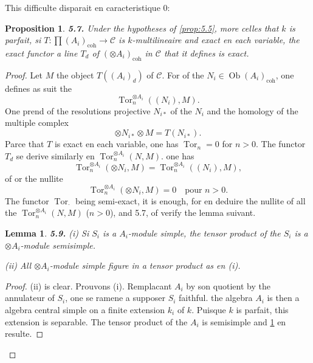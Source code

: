 \documentclass[12pt,a4paper]{article}
\theoremstyle{plain}
\newtheorem{lemma}[theorem]{Lemma}
\newtheorem{proposition}[theorem]{Proposition}
\theoremstyle{definition}
\theoremstyle{remark}
\DeclareMathOperator{\Tor}{Tor}
\DeclareMathOperator{\Ob}{Ob}
\begin{document}
This difficulte disparait en caracteristique 0:

\begin{proposition}\label{prop:5.7}
\textbf{5.7.} Under the hypotheses of \ref{prop:5.5}, more celles that $k$ is parfait, si $T : \prod (A_i)_\mathrm{coh} \to \mathcal{C}$ is $k$-multilineaire and exact en each variable, the exact functor a line $T_d$ of $(\otimes A_i)_\mathrm{coh}$ in $\mathcal{C}$ that it defines is exact.
\end{proposition}

\begin{proof}
Let $M$ the object $T((A_i)_d)$ of $\mathcal{C}$. For of the $N_i \in \Ob(A_i)_\mathrm{coh}$, one defines as suit the
\[
\Tor_n^{\otimes A_i}((N_i), M).
\]
One prend of the resolutions projective $N_{i*}$ of the $N_i$ and the homology of the multiple complex
\[
\otimes N_{i*} \otimes M = T(N_{i*}).
\]
Parce that $T$ is exact en each variable, one has $\Tor_n = 0$ for $n > 0$. The functor $T_d$ se derive similarly en $\Tor_n^{\otimes A_i}(N, M)$. one has
\[
\Tor_n^{\otimes A_i}(\otimes N_i, M) = \Tor_n^{\otimes A_i}((N_i), M),
\]
of or the nullite
\begin{equation}\label{eq:5.7.1}
\Tor_n^{\otimes A_i}(\otimes N_i, M) = 0 \quad \text{pour } n > 0.
\end{equation}
The functor $\Tor_\cdot$ being semi-exact, it is enough, for en deduire the nullite of all the $\Tor_n^{\otimes A_i}(N, M)$ ($n > 0$), and 5.7, of verify the lemma suivant.

\begin{lemma}\label{lem:5.9}
\textbf{5.9.} (i) Si $S_i$ is a $A_i$-module simple, the tensor product of the $S_i$ is a $\otimes A_i$-module semisimple.

(ii) All $\otimes A_i$-module simple figure in a tensor product as en (i).
\end{lemma}

\begin{proof}
(ii) is clear. Prouvons (i). Remplacant $A_i$ by son quotient by the annulateur of $S_i$, one se ramene a supposer $S_i$ faithful. the algebra $A_i$ is then a algebra central simple on a finite extension $k_i$ of $k$. Puisque $k$ is parfait, this extension is separable. The tensor product of the $A_i$ is semisimple and \ref{lem:5.9} en resulte.
\end{proof}
\end{proof}

\subsection{}
\end{document}
